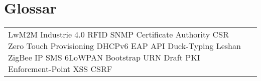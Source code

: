 \chapter{Glossar}
\begin{table}[H]
\centering
\begin{tabular}{@{} p{3cm} p{11cm}}    
LwM2M
Industrie 4.0
RFID    
SNMP
Certificate Authority
CSR
Zero Touch Provisioning
DHCPv6
EAP
API
Duck-Typing
Leshan
ZigBee IP
SMS
6LoWPAN
Bootstrap
URN
Draft
PKI
Enforcment-Point
XSS
CSRF
\end{tabular}
\end{table} 